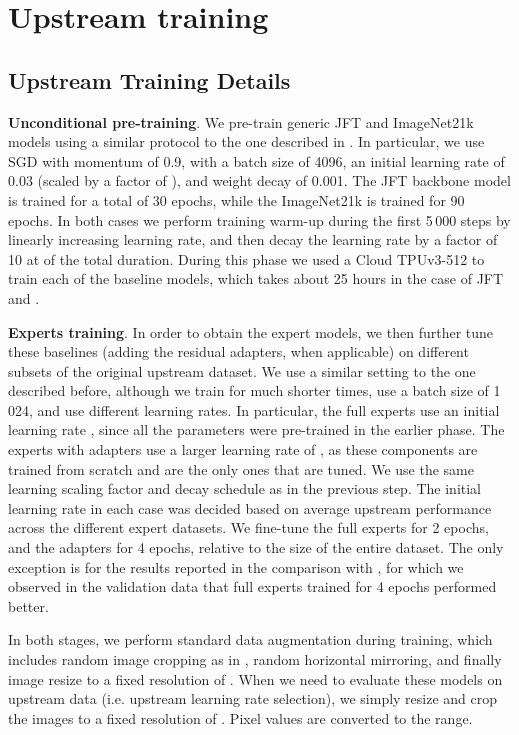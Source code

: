 \documentclass{article}
\newcommand{\JFT}{{JFT}\xspace}
\begin{document}
 \section{Upstream training}
\label{sec:upstream_training_details}

\subsection{Upstream Training Details}
\label{subsec:exp_upstream_training}

\textbf{Unconditional pre-training}.
We pre-train generic \JFT and ImageNet21k models using 
a similar protocol to the one described in \cite{kolesnikov2019large}. 
In particular, we use SGD with momentum of 0.9, with a batch size of
4096, an initial learning rate of 0.03 (scaled by a factor of 
), and weight decay of 0.001. 
The \JFT backbone model is trained for a total of 30 epochs, while 
the ImageNet21k is trained for 90 epochs. 
In both cases we perform training warm-up during the first 5\,000 
steps by linearly increasing learning rate, and then decay the
learning rate by a factor of 10 at
 of the total duration.
During this phase we used a Cloud TPUv3-512 to train each of the
baseline models, which takes about 25 hours in the case of \JFT 
and .

\textbf{Experts training}.
In order to obtain the expert models, we then further tune these 
baselines (adding the residual adapters, when applicable) on different
subsets of the original upstream dataset. We use a similar
setting to the one described before, although we train for much 
shorter times, use a batch size of 1\,024, and use different 
learning rates. In particular, 
the full experts use an initial learning rate , since
all the parameters were pre-trained in the earlier phase. 
The experts with adapters use a larger learning rate of , 
as these components are trained from scratch and are the only ones
that are tuned. We use the same learning scaling factor and decay 
schedule as in the previous step. The initial learning rate in each 
case was decided based on average upstream performance across the
different expert datasets.
We fine-tune the full experts for 2 epochs, and the adapters 
for 4 epochs, relative to the size of the entire dataset. The only
exception is for the results reported in the comparison with 
\cite{ngiam2018domain}, for which we observed in the validation data
that full experts trained for 4 epochs performed better.

In both stages, we perform standard data augmentation during training,
which includes random image cropping as in \cite{Szegedy_2015_CVPR}, 
random horizontal mirroring, and finally image resize to a fixed 
resolution of . When we need to evaluate these models
on upstream data (i.e. upstream learning rate selection), 
we simply resize and crop the images to a 
fixed resolution of . 
Pixel values are converted to the  range.
\end{document}
